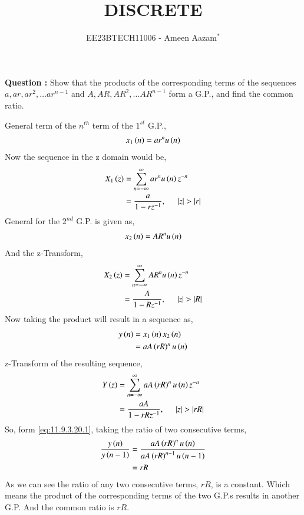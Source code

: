 \documentclass[journal,12pt,twocolumn]{IEEEtran}
\theoremstyle{remark}
\begin{document}

\vspace{3cm}

\title{DISCRETE}
\author{EE23BTECH11006 - Ameen Aazam$^{*}$%
}
\maketitle
\newpage
\bigskip

\renewcommand{\thefigure}{\theenumi}
\renewcommand{\thetable}{\theenumi}

\vspace{3cm}
\textbf{Question :}
Show that the products of the corresponding terms of the sequences $a, ar, ar^2, \ldots ar^{n-1}$ and $A, AR, AR^2, \ldots AR^{n-1}$ form a G.P., and find the common ratio.

\solution

General term of the $n^{th}$ term of the $1^{st}$ G.P.,
\begin{align}
    x_1\left(n\right)=ar^nu\left(n\right)
\end{align}
Now the sequence in the z domain would be,
\begin{align}
    X_1\left(z\right)&=\sum\limits_{n=-\infty}^{\infty}ar^nu\left(n\right)z^{-n} \\
    &=\frac{a}{1-rz^{-1}},\hspace{0.5cm}\left\vert z\right\vert>\left\vert r\right\vert
\end{align}
General for the $2^{nd}$ G.P. is given as,
\begin{align}
    x_2\left(n\right)=AR^nu\left(n\right)
\end{align}
And the z-Transform,
\begin{align}
    X_2\left(z\right)&=\sum\limits_{n=-\infty}^{\infty}AR^nu\left(n\right)z^{-n} \\
    &=\frac{A}{1-Rz^{-1}},\hspace{0.5cm}\left\vert z\right\vert>\left\vert R\right\vert
\end{align}
Now taking the product will result in a sequence as,
\begin{align}
    y\left(n\right)&=x_1\left(n\right)x_2\left(n\right) \\
    &=aA\left(rR\right)^nu\left(n\right) \label{eq:11.9.3.20.1}
\end{align}
z-Transform of the resulting sequence,
\begin{align}
    Y\left(z\right)&=\sum\limits_{n=-\infty}^{\infty}aA\left(rR\right)^nu\left(n\right)z^{-n} \\
    &=\frac{aA}{1-rRz^{-1}},\hspace{0.5cm}\left\vert z\right\vert>\left\vert rR\right\vert
\end{align}
So, form \ref{eq:11.9.3.20.1}, taking the ratio of two consecutive terms,
\begin{align}
    \frac{y\left(n\right)}{y\left(n-1\right)}&=\frac{aA\left(rR\right)^nu\left(n\right)}{aA\left(rR\right)^{n-1}u\left(n-1\right)} \\
    &=rR
\end{align}
As we can see the ratio of any two consecutive terms, $rR$, is a constant. Which means the product of the corresponding terms of the two G.P.s results in another G.P.
And the common ratio is $rR$.
\end{document}
